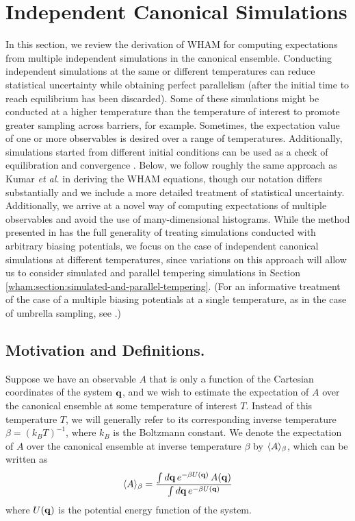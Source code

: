 \section{Independent Canonical Simulations}
\label{wham:section:wham-review}

In this section, we review the derivation of WHAM for computing expectations from multiple independent simulations in the canonical ensemble.  Conducting independent simulations at the same or different temperatures can reduce statistical uncertainty while obtaining perfect parallelism (after the initial time to reach equilibrium has been discarded).  Some of these simulations might be conducted at a higher temperature than the temperature of interest to promote greater sampling across barriers, for example.  Sometimes, the expectation value of one or more observables is desired over a range of temperatures.  Additionally, simulations started from different initial conditions can be used as a check of equilibration and convergence \cite{gelman:1992a}. Below, we follow roughly the same approach as Kumar \emph{et al.} \cite{kumar:1992a} in deriving the WHAM equations, though our notation differs substantially and we include a more detailed treatment of statistical uncertainty.  Additionally, we arrive at a novel way of computing expectations of multiple observables and avoid the use of many-dimensional histograms.  While the method presented in \cite{kumar:1992a} has the full generality of treating simulations conducted with arbitrary biasing potentials, we focus on the case of independent canonical simulations at different temperatures, since variations on this approach will allow us to consider simulated and parallel tempering simulations in Section \ref{wham:section:simulated-and-parallel-tempering}. (For an informative treatment of the case of a multiple biasing potentials at a single temperature, as in the case of umbrella sampling, see \cite{souaille:2001a}.)

\subsection{Motivation and Definitions.}

Suppose we have an observable $A$ that is only a function of the Cartesian coordinates of the system ${\bf q}$, and we wish to estimate the expectation of $A$ over the canonical ensemble at some temperature of interest $T$.  Instead of this temperature $T$, we will generally refer to its corresponding inverse temperature $\beta = (k_B T)^{-1}$, where $k_B$ is the Boltzmann constant.  We denote the expectation of $A$ over the canonical ensemble at inverse temperature $\beta$ by $\langle A \rangle_\beta$, which can be written as
\begin{equation}
\langle A \rangle_\beta = \frac{\int d{\bf q} \, e^{-\beta U({\bf q})} \, A({\bf q})}{\int d{\bf q} \, e^{-\beta U({\bf q})}} \label{wham:equation:configuration-average}
\end{equation}
where $U({\bf q})$ is the potential energy function of the system.


